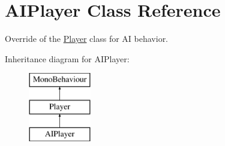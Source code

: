 \hypertarget{class_a_i_player}{}\section{A\+I\+Player Class Reference}
\label{class_a_i_player}


Override of the \hyperlink{class_player}{Player} class for A\+I behavior.  


Inheritance diagram for A\+I\+Player\+:\begin{figure}[H]
\begin{center}
\leavevmode
\includegraphics[height=3.000000cm]{class_a_i_player}
\end{center}
\end{figure}
